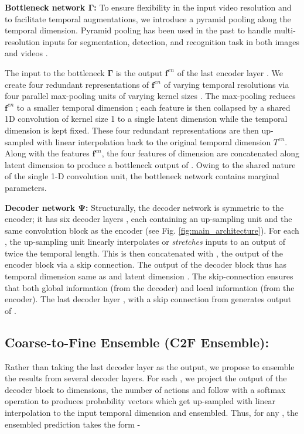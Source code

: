 \documentclass[10pt,twocolumn,letterpaper]{article}
\newcommand{\feat}{\mathbf{f}}
\newcommand{\dec}{\ensuremath{\mathbf{\Psi}}}
\newcommand{\bottle}{\ensuremath{\mathbf{\Gamma}}}
\newcommand{\tenc}{\ensuremath{T^{en}}}
\newcommand{\fenc}{\ensuremath{\feat^{en}}}
\begin{document}
\textbf{Bottleneck network \bottle:} 
To ensure flexibility in the input video resolution and to facilitate temporal augmentations, we introduce a pyramid pooling \cite{spp_original}
along the temporal dimension. Pyramid pooling has been used in the past to handle multi-resolution inputs for segmentation, detection, and recognition task in both images and videos \cite{spatial-pp, temporal-pp, deeplab, deeplabv3, dac-spp-unet, zheng2019spatial}.

The input to the bottleneck \bottle{} is the output \fenc{} of the last encoder layer .  We create four redundant representations of \fenc{} of varying temporal resolutions via 
four parallel max-pooling units of varying kernel sizes . The max-pooling reduces \fenc{} 
to a smaller temporal dimension ; each feature is then collapsed by a shared 1D convolution of kernel size 1 to a single latent dimension while the temporal dimension is kept fixed. 
These four redundant representations are then up-sampled with linear interpolation back to the original temporal dimension \tenc{}. Along with the features \fenc{}, the four features of dimension  are concatenated along latent dimension to produce a bottleneck output of . 
Owing to the shared nature of the single 1-D convolution unit, the bottleneck network contains marginal parameters.

\textbf{Decoder network \dec:} Structurally, the decoder network is symmetric to the encoder; it has six decoder layers , each containing an up-sampling unit and the same convolution block as the encoder (see Fig. \ref{fig:main_architecture}). 
For each , the up-sampling unit linearly interpolates or \emph{stretches} inputs to an output of twice the temporal length.
This is then concatenated with , \ie the output of the  encoder block via a skip connection. 
The output of the  decoder block thus has temporal dimension same as  and latent dimension . 
The skip-connection ensures that both global information (from the decoder) and local information (from the encoder).  The last decoder layer , with a skip connection from  generates output of . 

\subsection{Coarse-to-Fine Ensemble (C2F Ensemble):}\label{subsec:multilayer_ensemble}
Rather than taking the last decoder layer as the output, we propose to ensemble the results from several decoder layers. For each , we project the output of the  decoder block  to 
 dimensions, \ie the number of actions and follow with a 
softmax operation to produces probability vectors  which 
get up-sampled with linear interpolation to the input temporal dimension  and ensembled. Thus, for any , the ensembled
prediction  takes the form -
\end{document}
